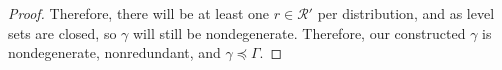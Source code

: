 \documentclass[12pt]{article}
\newcommand{\Comments}{1}
\newcommand{\mynote}[2]{\ifnum\Comments=1\textcolor{#1}{#2}\fi}
\newcommand{\jessie}[1]{\mynote{purple}{[JF: #1]}}
\newcommand{\R}{\mathcal{R}}
\newcommand{\inter}[1]{\mathring{#1}}%
\begin{document}
\begin{proof}
	Therefore, there will be at least one $r \in \R'$ per distribution, and as level sets are closed, so $\gamma$ will still be nondegenerate.
	Therefore, our constructed $\gamma$ is nondegenerate, nonredundant, and $\gamma \preceq \Gamma$.
	
	
\end{proof}
\end{document}

